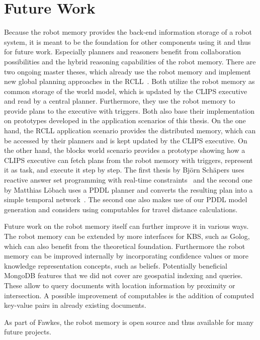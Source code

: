 \section{Future Work}
\label{sec:future-work}
Because the robot memory provides the back-end information storage of
a robot system, it is meant to be the foundation for other components
using it and thus for future work. Especially planners and reasoners
benefit from collaboration possibilities and the hybrid reasoning
capabilities of the robot memory. There are two ongoing master theses,
which already use the robot memory and implement new global planning
approaches in the RCLL~\cite{bjoern-thesis,matthias-thesis}. Both utilize the robot memory as common
storage of the world model, which is updated by the CLIPS executive
and read by a central planner. Furthermore, they use the robot memory
to provide plans to the executive with triggers. Both also base their
implementation on prototypes developed in the application scenarios of
this thesis. On the one hand, the RCLL application scenario provides
the distributed memory, which can be accessed by their planners and is
kept updated by the CLIPS executive. On the other hand, the blocks
world scenario provides a prototype showing how a CLIPS executive can
fetch plans from the robot memory with triggers, represent it as task,
and execute it step by step. The first thesis by Björn Schäpers uses reactive answer set
programming with real-time constraints~\cite{bjoern-thesis} and the
second one by Matthias Löbach uses a PDDL planner and converts the resulting plan into a
simple temporal network~\cite{matthias-thesis}. The second one also
makes use of our PDDL model generation and considers using
computables for travel distance calculations.

Future work on the robot memory itself can further improve it in
various ways. The robot memory can be extended by more interfaces for
KBS, such as Golog, which can also benefit from the theoretical
foundation. Furthermore the robot memory can be improved internally by
incorporating confidence values or more knowledge representation
concepts, such as beliefs. Potentially beneficial MongoDB features
that we did not cover are geospatial indexing and queries. These allow
to query documents with location information by proximity or
intersection. A possible improvement of computables is the addition
of computed key-value pairs in already existing documents.


As part of Fawkes, the robot memory is open source and thus available
for many future projects.
